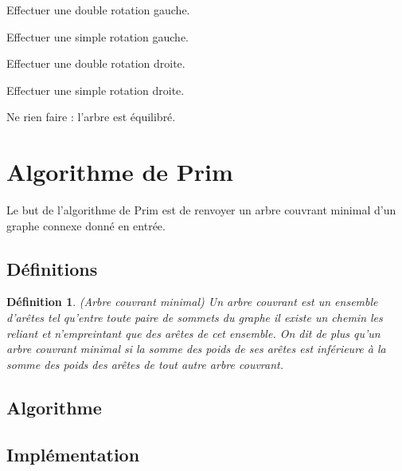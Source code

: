 \documentclass{article}
\newtheorem*{ddef}{Définition}
\begin{document}
\begin{algorithmic}


Effectuer une double rotation gauche.
\Else

Effectuer une simple rotation gauche.

\EndIf
{}


Effectuer une double rotation droite.
\Else

Effectuer une simple rotation droite.
\EndIf
\Else

Ne rien faire : l'arbre est équilibré.
\EndIf
\end{algorithmic}




\section{Algorithme de Prim}
Le but de l'algorithme de Prim est de renvoyer un arbre couvrant minimal d'un graphe connexe donné en entrée.

\subsection{Définitions}

\begin{ddef}(Arbre couvrant minimal)
 Un arbre couvrant est un ensemble d'arêtes tel qu'entre toute paire de sommets du graphe il existe un chemin les reliant et n'empreintant que des arêtes de cet
 ensemble.
 On dit de plus qu'un arbre couvrant minimal si la somme des poids de ses arêtes est inférieure à la somme des poids des arêtes de tout autre arbre couvrant.
\end{ddef}

\subsection{Algorithme}

\subsection{Implémentation}

\end{document}
